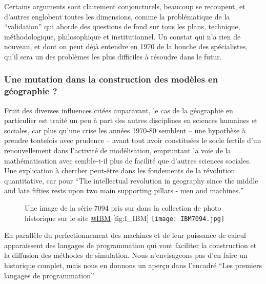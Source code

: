 Certains arguments sont clairement conjoncturels, beaucoup se recoupent, et d'autres englobent toutes les dimensions, comme la problématique de la \enquote{validation} qui aborde des questions de fond sur tous les plans, technique, méthodologique, philosophique et institutionnel. Un constat qui n'a rien de nouveau, et dont on peut déjà entendre en 1970 de la bouche des spécialistes, qu'il sera un des problèmes les plus difficiles à résoudre dans le futur. \autocites{Hermann1967,Naylor1967,Guetzkow1972}  %


\subsubsection{Une mutation dans la construction des modèles en géographie ?}
\label{ssec:crise_mutation}

Fruit des diverses influences citées auparavant, le cas de la géographie en particulier est traité un peu à part des autres disciplines en sciences humaines et sociales, car plus qu'une crise les années 1970-80 semblent -- une hypothèse à prendre toutefois avec prudence -- avant tout avoir constituées le socle fertile d'un renouvellement dans l'activité de modélisation, empruntant la voie de la mathématisation avec semble-t-il plus de facilité que d'autres sciences sociales. Une explication à chercher peut-être dans les fondements de la révolution quantitative, car pour \textcite{Gould1970} \foreignquote{english}{The intellectual revolution in geography since the middle and late fifties rests upon two main supporting pillars - men and machines.}

\begin{figure}[h]
\begin{sidecaption}[fortoc]{Une image de la série 7094 pris sur dans la collection de photo historique sur le site \href{http://www-03.ibm.com/ibm/history/exhibits/mainframe/mainframe_album.html}{@IBM} }[fig:I_IBM]
  \centering
 \texttt{[image: IBM7094.jpg]}
  \end{sidecaption}
\end{figure}

En parallèle du perfectionnement des machines et de leur puissance de calcul apparaissent des langages de programmation qui vont faciliter la construction et la diffusion des méthodes de simulation. Nous n'envisageons pas d'en faire un historique complet, mais nous en donnons un aperçu dans l'encadré \enquote{Les premiers langages de programmation}.

